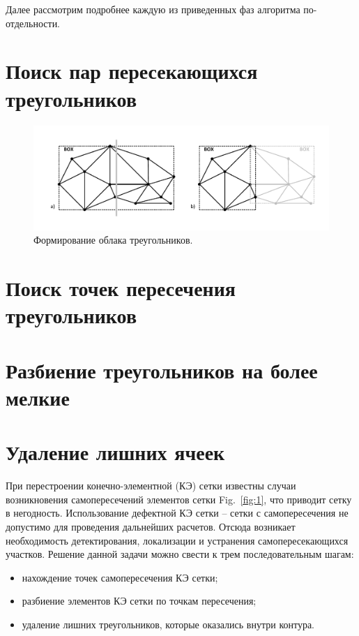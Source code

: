 \documentclass[
11pt,%
tightenlines,%
twoside,%
onecolumn,%
nofloats,%
nobibnotes,%
nofootinbib,%
superscriptaddress,%
noshowpacs,%
centertags]%
{revtex4}
\begin{document}
Далее рассмотрим подробнее каждую из приведенных фаз алгоритма по-отдельности.

\section{Поиск пар пересекающихся треугольников}

\begin{figure}[h]
\includegraphics[width=1.0\textwidth]{pics/pic_triangles_cloud_s.pdf}
\caption{Формирование облака треугольников.}\label{fig:pic_triangles_cloud_s}
\end{figure}

\section{Поиск точек пересечения треугольников}

\section{Разбиение треугольников на более мелкие}

\section{Удаление лишних ячеек}

При перестроении конечно-элементной (КЭ) сетки известны случаи возникновения самопересечений элементов сетки Fig.~\ref{fig:1}, что приводит сетку в негодность. Использование дефектной КЭ сетки – сетки с самопересечения не допустимо для проведения дальнейших расчетов. Отсюда возникает необходимость детектирования, локализации и устранения самопересекающихся участков.
Решение данной задачи можно свести к трем последовательным шагам:

\begin{itemize}
  \item нахождение точек самопересечения КЭ сетки;
  \item разбиение элементов КЭ сетки по точкам пересечения;
  \item удаление лишних треугольников, которые оказались внутри контура.
\end{itemize}
\end{document}
